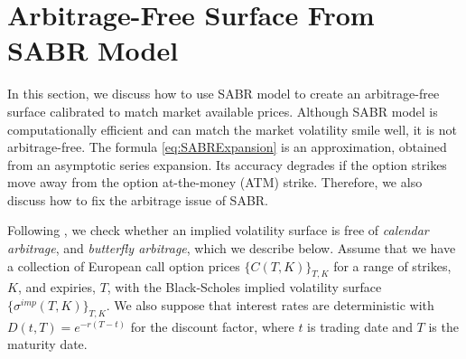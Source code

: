 \documentclass[letterpaper,12pt,titlepage,oneside,final]{book}
\numberwithin{equation}{section}
\theoremstyle{definition}
\begin{document}
\section{Arbitrage-Free Surface From SABR Model}
In this section, we discuss how to use SABR model to create an arbitrage-free surface calibrated to match market available prices. Although SABR model is computationally efficient and can match the market volatility smile well, it is not arbitrage-free. The formula \eqref{eq:SABRExpansion} is an approximation, obtained from  an asymptotic series expansion. Its accuracy degrades if the option strikes move away from the option at-the-money (ATM) strike. Therefore, we also discuss how to fix the arbitrage issue of SABR.


Following \cite{gatheral2014arbitrage}, we  check whether  an implied volatility surface is free of \textit{calendar arbitrage}, and \textit{butterfly arbitrage}, which we describe below. Assume that we have a collection of European call option prices $\{C(T,K)\}_{T,K}$ for a range of strikes, $K$, and expiries, $T$, with the Black-Scholes implied volatility surface $\{ \sigma^{imp}(T,K)\}_{T,K}$. We also suppose that interest rates are deterministic with $D(t,T)=e^{-r(T-t)}$ for the discount factor, where $t$ is trading date and $T$ is the maturity date.
\end{document}
